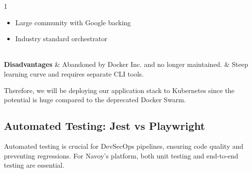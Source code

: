 \begin{table}[H]
\begin{tabularx}{1\textwidth}
\begin{itemize}[leftmargin=*, topsep=0pt, itemsep=1pt, parsep=2pt]
            \item Large community with Google backing
            \item Industry standard orchestrator
        \end{itemize}                                  \\
        \hline
        \textbf {Disadvantages}             & \noindent Abandoned by Docker Inc. and no longer maintained.                                                                                                                                                                                                                       & \noindent Steep learning curve and requires separate CLI tools. \\
        \hline
    \end{tabularx}
\end{table}
Therefore, we will be deploying our application stack to Kubernetes since the potential is huge compared to the deprecated Docker Swarm.

\subsection{Automated Testing: Jest vs Playwright}
Automated testing is crucial for DevSecOps pipelines, ensuring code quality and preventing regressions. For Navoy's platform, both unit testing and end-to-end testing are essential.

